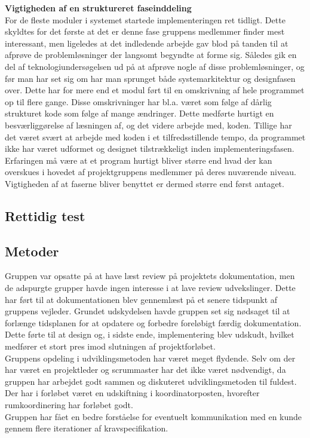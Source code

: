 \textbf{Vigtigheden af en struktureret faseinddeling}\\
For de fleste moduler i systemet startede implementeringen ret tidligt. Dette skyldtes for det første at det er denne fase gruppens medlemmer finder mest interessant, men ligeledes at det indledende arbejde gav blod på tanden til at afprøve de problemløsninger der langsomt begyndte at forme sig. Således gik en del af teknologiundersøgelsen ud på at afprøve nogle af disse problemløsninger, og før man har set sig om har man sprunget både systemarkitektur og designfasen over. Dette har for mere end et modul ført til en omskrivning af hele programmet op til flere gange. Disse omskrivninger har bl.a. været som følge af dårlig strukturet kode som følge af mange ændringer. Dette medførte hurtigt en besværliggørelse af læsningen af, og det videre arbejde med, koden. Tillige har det været svært at arbejde med koden i et tilfredsstillende tempo, da programmet ikke har været udformet og designet tilstrækkeligt inden implementeringsfasen. Erfaringen må være at et program hurtigt bliver større end hvad der kan overskues i hovedet af projektgruppens medlemmer på deres nuværende niveau. Vigtigheden af at faserne bliver benyttet er dermed større end først antaget.\\

\subsection{Rettidig test}


\subsection{Metoder}
Gruppen var opsatte på at have læst review på projektets dokumentation, men de adspurgte grupper havde ingen interesse i at lave review udvekslinger. Dette har ført til at dokumentationen blev gennemlæst på et senere tidspunkt af gruppens vejleder. Grundet udskydelsen havde gruppen set sig nødsaget til at forlænge tidsplanen for at opdatere og forbedre foreløbigt færdig dokumentation. Dette førte til at design og, i sidste ende, implementering blev udskudt, hvilket medfører et stort pres imod slutningen af projektforløbet.\\
Gruppens opdeling i udviklingsmetoden har været meget flydende. Selv om der har været en projektleder og scrummaster har det ikke været nødvendigt, da gruppen har arbejdet godt sammen og diskuteret udviklingsmetoden til fuldest. Der har i forløbet været en udskiftning i koordinatorposten, hvorefter rumkoordinering har forløbet godt.\\
Gruppen har fået en bedre forståelse for eventuelt kommunikation med en kunde gennem flere iterationer af kravspecifikation.

